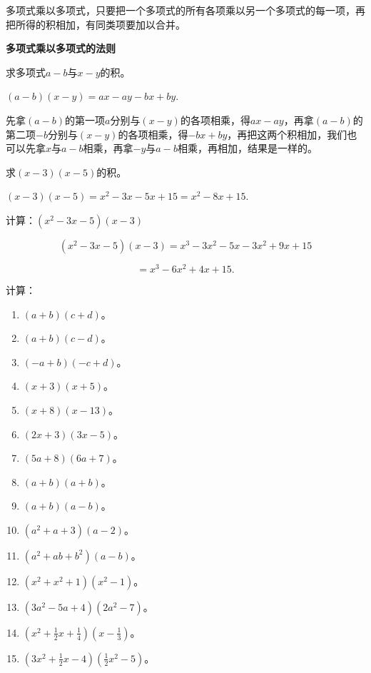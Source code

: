多项式乘以多项式，只要把一个多项式的所有各项乘以另一个多项式的每一项，再把所得的积相加，有同类项要加以合并。

\textbf{多项式乘以多项式的法则}

 求多项式\(a - b\)与\(x - y\)的积。

\((a - b)(x - y) = ax - ay - bx + by.\)

先拿\((a - b)\)的第一项\(a\)分别与\((x - y)\)的各项相乘，得\(ax - ay\)，再拿\((a - b)\)的第二项\(-b\)分别与\((x - y)\)的各项相乘，得\(-bx + by\)，再把这两个积相加，我们也可以先拿\(x\)与\(a - b\)相乘，再拿\(-y\)与\(a - b\)相乘，再相加，结果是一样的。

 求\((x - 3)(x - 5)\)的积。

\((x - 3)(x - 5) = x^2 - 3x - 5x + 15 = x^2 - 8x + 15.\)

 计算：\((x^{2} - 3x - 5)(x - 3)\)


\[
(x ^{2} - 3 x - 5) (x - 3) = x ^{3} - 3 x ^{2} - 5 x - 3 x ^{2} + 9 x + 15
\]

\[
= x ^{3} - 6 x ^{2} + 4 x + 15.
\]

计算：

\begin{enumerate}[start=1]
\item
  \((a + b)(c + d)\)。
\item
  \((a + b)(c - d)\)。
\item
  \((-a + b)(-c + d)\)。
\item
  \((x + 3)(x + 5)\)。
\item
  \((x + 8)(x - 13)\)。
\item
  \((2x + 3)(3x - 5)\)。
\item
  \((5a + 8)(6a + 7)\)。
\item
  \((a + b)(a + b)\)。
\item
  \((a + b)(a - b)\)。
\item
  \((a^{2} + a + 3)(a - 2)\)。
\item
  \((a^{2} + ab + b^{2})(a - b)\)。
\item
  \((x^{2} + x^{2} + 1)(x^{2} - 1)\)。
\item
  \((3a^{2} - 5a + 4)(2a^{2} - 7)\)。
\item
  \(\left(x^{2} + \frac{1}{2} x + \frac{1}{4}\right)\left(x - \frac{1}{3}\right)\)。
\item
  \(\left(3x^{2} + \frac{1}{2} x - 4\right)\left(\frac{1}{2} x^{2} - 5\right)\)。
\end{enumerate}


